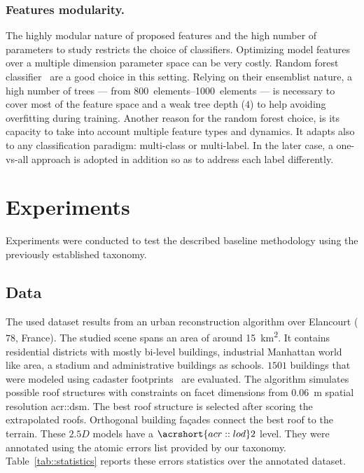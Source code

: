 \documentclass[runningheads]{llncs}
\begin{document}
\subsubsection{Features modularity.} The highly modular nature of proposed features and the high number of parameters to study restricts the choice of classifiers. Optimizing model features over a multiple dimension parameter space can be very costly. Random forest classifier~\cite{breiman2001random} are a good choice in this setting. Relying on their ensemblist nature, a high number of trees --- from \SIrange{800}{1000}{elements} --- is necessary to cover most of the feature space and a weak tree depth ($4$) to help avoiding overfitting during training. Another reason for the random forest choice, is its capacity to take into account multiple feature types and dynamics. It adapts also to any classification paradigm: multi-class or multi-label. In the later case, a one-vs-all approach is adopted in addition so as to address each label differently.
\section{Experiments}

Experiments were conducted to test the described baseline methodology using the previously established taxonomy.
\subsection{Data}

The used dataset results from an urban reconstruction algorithm over Elancourt ($78$, France). The studied scene spans an area of around \SI{15}{\km\squared}. It contains residential districts with mostly bi-level buildings, industrial Manhattan world like area, a stadium and administrative buildings as schools. $1501$ buildings that were modeled using cadaster footprints~\cite{Durupt2006} are evaluated. The algorithm simulates possible roof structures with constraints on facet dimensions from \SI{0.06}{\m} spatial resolution \acrshort{acr::dsm}. The best roof structure is selected after scoring the extrapolated roofs. Orthogonal building fa\c{c}ades connect the best roof to the terrain. These $2.5D$ models have a $\acrshort{acr::lod}2$ level. They were annotated using the atomic errors list provided by our taxonomy. Table~\ref{tab::statistics} reports these errors statistics over the annotated dataset.
\end{document}
